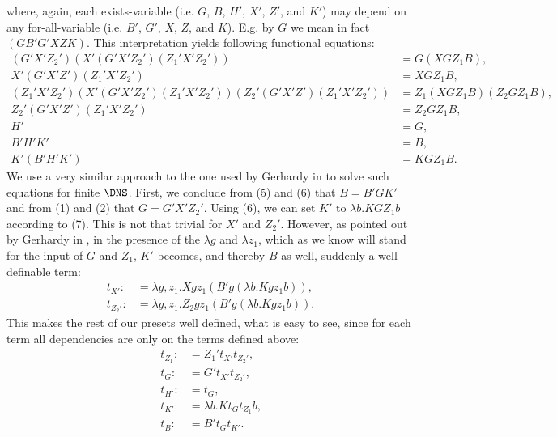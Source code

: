 where, again, each exists-variable (i.e. $G$, $B$, $H'$, $X'$, $Z'$, and $K'$) 
may depend on any 
for-all-variable (i.e. $B'$, $G'$, $X$, $Z$, and $K$). E.g. by $G$ we mean in 
fact $(GB'G'XZK)$.  This interpretation
yields following functional equations:
\setcounter{equation}{0}
\begin{align}
     (G'X'Z_2')(X'(G'X'Z_2')(Z_1'X'Z_2'))&=G(XGZ_1B)\text{,}\\         %
     X'(G'X'Z')(Z_1'X'Z_2')&=XGZ_1B  \text{,}\\                        %
     (Z_1'X'Z_2')(X'(G'X'Z_2')(Z_1'X'Z_2'))(Z_2'(G'X'Z')(Z_1'X'Z_2'))&=Z_1(XGZ_1B)(Z_2GZ_1B) \text{,}\\    %
     Z_2'(G'X'Z')(Z_1'X'Z_2')&=Z_2GZ_1B \text{,}\\                     %
     H'&=G \text{,}\\                                                  %
     B'H'K'&=B \text{,}\\                                               %
     K'(B'H'K')&=KGZ_1B                                        %
\text{.}
\end{align}
We use a very similar approach to the one used by Gerhardy in \cite{GerhardyX} to
solve such equations for finite $\DNS$. First, we conclude from (5) and (6)
that $B=B'GK'$ and from (1) and (2) that $G=G'X'Z_2'$. Using (6), we can set 
$K'$ to $\lambda b.KGZ_1b$ according to (7). This is not that trivial
for $X'$ and $Z_2'$. However, as pointed out by Gerhardy in \cite{GerhardyX}, in the presence
of the $\lambda g$ and $\lambda z_1$, which as we know will stand for the input 
of $G$ and $Z_1$, $K'$ becomes, and thereby $B$ as well, suddenly a well definable term:
\begin{align*} 
t_{X'}:&=\lambda g,z_1.Xgz_1(B'g(\lambda b.Kgz_1b))\text{,}\\
t_{Z_2'}:&=\lambda g,z_1.Z_2gz_1(B'g(\lambda b.Kgz_1b))\text{.}
\end{align*} 
This makes the rest of our presets well defined, what is easy
to see, since for each term all dependencies are only on
the terms defined above:
\begin{align*} 
t_{Z_1}:&=Z_1't_{X'}t_{Z_2'}\text{,}\\
t_{G}:&=G't_{X'}t_{Z_2'}\text{,}\\
t_{H'}:&=t_{G}\text{,}\\
t_{K'}:&=\lambda b.Kt_{G}t_{Z_1}b\text{,}\\
t_{B}:&=B't_{G}t_{K'}\text{.}
\end{align*} 
